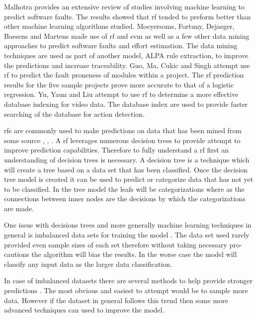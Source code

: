 Malhotra provides an extensive review of studies involving machine learning to predict software faults\cite{Malhotra2015}. The results showed that \gls{rf} tended to preform better than other machine learning algorithms studied. Moeyersoms, Fortuny, Dejaeger, Baesens and
Martens made use of \gls{rf} and \gls{svm} as well as a few other data mining approaches to predict software faults and effort estimation\cite{Moeyersoms2015}. The data mining techniques are used as part of another model, ALPA rule extraction, to improve the predictions and increase traceability. Guo, Ma, Cukic and Singh attempt use \gls{rf} to predict the fault proneness of modules within a project\cite{Guo2004}. The \gls{rf} prediction results for the five sample projects prove more accurate to that of a logistic regression. Yu, Yaun and Liu attempt to use \gls{rf} to determine a more effective database indexing for video data\cite{Yu2011}. The database index are used to provide faster searching of the database for action detection.

\gls{rf}s are commonly used to make predictions on data that has been mined from some source \cite{Alam2013}, \cite{Granitto2007}, \cite{Yu2011}. A \gls{rf} leverages numerous decision trees to provide attempt to improve prediction capabilities. Therefore to fully understand a \gls{rf} first an understanding of decision trees is necessary. A decision tree is a technique which will create a tree based on a data set that has been classified. Once the decision tree model is created it can be used to predict or categorize data that has not yet to be classified. In the tree model the leafs will be categorizations where as the connections between inner nodes are the decisions by which the categorizations are made.

One issue with decisions trees and more generally machine learning techniques in general is imbalanced data sets for training the model \cite{Khoshgoftaar2007}. The data set used rarely provided even sample sizes of each set therefore without taking necessary pro-cautions the algorithm will bias the results. In the worse case the model will classify any input data as the larger data classification.

In case of imbalanced datasets there are several methods to help provide stronger predictions \cite{Khoshgoftaar2007}. The most obvious and easiest to attempt would be to sample more data. However if the dataset in general follows this trend then some more advanced techniques can used to improve the model.


